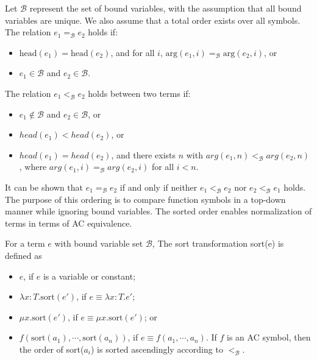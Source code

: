\documentclass[runningheads]{llncs}
\begin{document}
\begin{definition}
Let \( \mathcal{B} \) represent the set of bound variables, with the assumption that all bound variables are unique. We also assume that a total order exists over all symbols. The relation \( e_1 =_\mathcal{B} e_2 \) holds if:
\begin{itemize}
    \item \( \textrm{head}(e_1) = \textrm{head}(e_2) \), and for all \( i \), \( \textrm{arg}(e_1, i) =_\mathcal{B} \textrm{arg}(e_2, i) \), or
    \item \( e_1 \in \mathcal{B} \) and \(e_2 \in \mathcal{B}\).
\end{itemize}

The relation \( e_1 <_\mathcal{B} e_2 \) holds between two terms if:
\begin{itemize}
    \item $e_1 \notin \mathcal{B}$ and $e_2 \in \mathcal{B}$, or
    \item $head(e_1) < head(e_2)$, or
    \item $head(e_1) = head(e_2)$, and there exists $n$ with $arg(e_1, n) <_\mathcal{B} arg(e_2, n)$, where $arg(e_1, i) =_\mathcal{B} arg(e_2, i)$ for all $i < n$.
\end{itemize}
\end{definition}
It can be shown that \( e_1 =_\mathcal{B} e_2 \) if and only if neither \( e_1 <_\mathcal{B} e_2 \) nor \( e_2 <_\mathcal{B} e_1 \) holds. The purpose of this ordering is to compare function symbols in a top-down manner while ignoring bound variables. The sorted order enables normalization of terms in terms of AC equivalence.
\begin{definition}
    For a term $e$ with bound variable set $\mathcal{B}$,
    The sort transformation sort(e) is defined as
    \begin{itemize}
        \item $e$, if $e$ is a variable or constant;
        \item $\lambda x:T. \textrm{sort}(e')$, if $e \equiv \lambda x : T. e'$;
        \item $\mu x. \textrm{sort}(e')$, if $e \equiv \mu x. \textrm{sort}(e')$; or
        \item $f(\textrm{sort}(a_1), \cdots, \textrm{sort}(a_n))$, if $e \equiv f(a_1, \cdots, a_n)$. If $f$ is an AC symbol, then the order of sort($a_i$) is sorted ascendingly according to $<_\mathcal{B}$.
    \end{itemize}
\end{definition}
\end{document}
